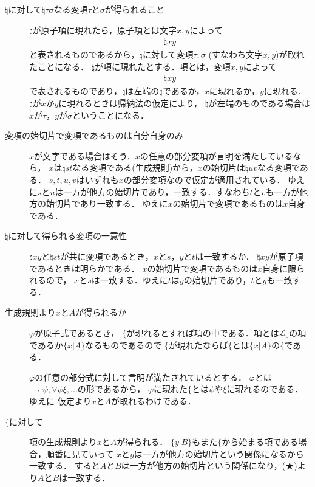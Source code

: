 \documentclass[a4j,10.5pt,oneside,openany]{jsbook}
\theoremstyle{mystyle}
\begin{document}
	\begin{description}
		\item[$\natural$に対して$\natural \tau \sigma$なる変項$\tau$と$\sigma$が得られること]
			$\natural$が原子項に現れたら，原子項とは文字$x,y$によって
			\begin{align}
				\natural xy
			\end{align}
			と表されるものであるから，$\natural$に対して変項$\tau,\sigma$ (すなわち文字$x,y$)が取れたことになる．
			$\natural$が項に現れたとする．項とは，変項$x,y$によって
			\begin{align}
				\natural xy
			\end{align}
			で表されるものであり，$\natural$は左端の$\natural$であるか，$x$に現れるか，$y$に現れる．
			$\natural$が$x$か$y$に現れるときは帰納法の仮定により，
			$\natural$が左端のものである場合は$x$が$\tau$，$y$が$\sigma$ということになる．
			
		\item[変項の始切片で変項であるものは自分自身のみ]
			$x$が文字である場合はそう．$x$の任意の部分変項が言明を満たしているなら，
			$x$は$\natural st$なる変項である(生成規則)から，$x$の始切片は$\natural uv$なる変項である．
			$s,t,u,v$はいずれも$x$の部分変項なので仮定が適用されている．
			ゆえに$s$と$u$は一方が他方の始切片であり，一致する．すなわち$t$と$v$も一方が他方の始切片であり一致する．
			ゆえに$x$の始切片で変項であるものは$x$自身である．
			
		\item[$\natural$に対して得られる変項の一意性]
			$\natural xy$と$\natural st$が共に変項であるとき，$x$と$s$，$y$と$t$は一致するか．
			$\natural xy$が原子項であるときは明らかである．
			$x$の始切片で変項であるものは$x$自身に限られるので，
			$x$と$s$は一致する．ゆえに$t$は$y$の始切片であり，$t$と$y$も一致する．
		
		\item[生成規則より$x$と$A$が得られるか]
			$\varphi$が原子式であるとき，
			$\{$が現れるとすれば項の中である．項とは$\mathcal{L}_{0}$の項であるか$\{x|A\}$なるものであるので
			$\{$が現れたならば$\{$とは$\{x|A\}$の$\{$である．
			
			$\varphi$の任意の部分式に対して言明が満たされているとする．
			$\varphi$とは$\rightharpoondown \psi,\vee \psi \xi,...$の形であるから，
			$\varphi$に現れた$\{$とは$\psi$や$\xi$に現れるのである．ゆえに
			仮定より$x$と$A$が取れるわけである．
			
		\item[$\{$に対して]
			項の生成規則より$x$と$A$が得られる．
			$\{y|B\}$もまた$\{$から始まる項である場合，順番に見ていって
			$x$と$y$は一方が他方の始切片という関係になるから一致する．
			すると$A$と$B$は一方が他方の始切片という関係になり，(★)より$A$と$B$は一致する．
			

\end{description}
\end{document}

